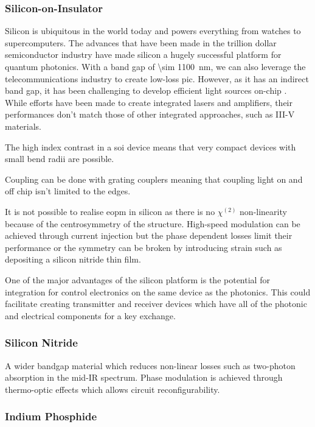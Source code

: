 \subsubsection*{Silicon-on-Insulator}

Silicon is ubiquitous in the world today and powers everything from watches to supercomputers. The advances that have been made in the trillion dollar semiconductor industry have made silicon a hugely successful platform for quantum photonics. With a band gap of \SI{\sim 1100}{nm}, we can also leverage the telecommunications industry to create low-loss \acl{pic}. However, as it has an indirect band gap, it has been challenging to develop efficient light sources on-chip \cite{}. While efforts have been made to create integrated lasers and amplifiers, their performances don't match those of other integrated approaches, such as III-V materials.

The high index contrast in a \ac{soi} device means that very compact devices with small bend radii are possible.

Coupling can be done with grating couplers meaning that coupling light on and off chip isn't limited to the edges.

It is not possible to realise \ac{eopm} in silicon as there is no $\chi^{(2)}$ non-linearity because of the centrosymmetry of the structure. High-speed modulation can be achieved through current injection but the phase dependent losses limit their performance \cite{} or the symmetry can be broken by introducing strain such as depositing a silicon nitride thin film.

One of the major advantages of the silicon platform is the potential for integration for control electronics on the same device as the photonics. This could facilitate creating transmitter and receiver devices which have all of the photonic and electrical components for a key exchange. 

\subsubsection*{Silicon Nitride}

A wider bandgap material which reduces non-linear losses such as two-photon absorption in the mid-IR spectrum. Phase modulation is achieved through thermo-optic effects which allows circuit reconfigurability.

\subsubsection*{Indium Phosphide}

